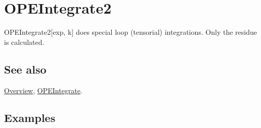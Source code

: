 \documentclass[../FeynCalcManual.tex]{subfiles}
\begin{document}
\hypertarget{opeintegrate2}{%
\section{OPEIntegrate2}\label{opeintegrate2}}

OPEIntegrate2{[}exp, k{]} does special loop (tensorial) integrations.
Only the residue is calculated.

\subsection{See also}

\hyperlink{toc}{Overview}, \hyperlink{opeintegrate}{OPEIntegrate}.

\subsection{Examples}
\end{document}
